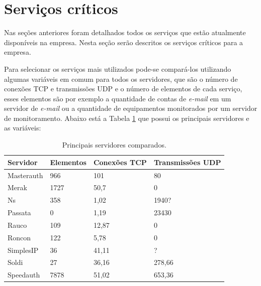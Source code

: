 \section{Serviços críticos}
\label{section:servcrit}

Nas seções anteriores foram detalhados todos os serviços que estão atualmente disponíveis na empresa. Nesta seção serão descritos os serviços 
críticos para a empresa. 

Para selecionar os serviços mais utilizados pode-se compará-los utilizando algumas variáveis em comum para todos os servidores, que são o número 
de conexões \ac{TCP} e transmissões \ac{UDP} e o número de elementos de cada serviço, esses elementos são por exemplo a quantidade de 
contas de \textit{e-mail} em um servidor de \textit{e-mail} ou a quantidade de equipamentos monitorados por um servidor de monitoramento. 
Abaixo está a Tabela \ref{tab:servicoscompara} que possui os principais servidores e as variáveis:

\begin{table}[h!]
\caption{Principais servidores comparados.}
\label{tab:servicoscompara}
\begin{center}
\begin{tabular}{|p{2cm}|l|l|l|}\hline
Servidor & Elementos & Conexões TCP & Transmissões UDP\\\hline
Masterauth & 966 & 101 & 80\\\hline
Merak & 1727 & 50,7 & 0\\\hline
Ns & 358 & 1,02 & 1940?\\\hline
Passata & 0 & 1,19 & 23430\\\hline
Rauco & 109 & 12,87 & 0\\\hline
Roncon & 122 & 5,78 & 0\\\hline
SimplesIP & 36 & 41,11 & ?\\\hline
Soldi & 27 & 36,16 & 278,66\\\hline
Speedauth & 7878 & 51,02 & 653,36\\\hline
\end{tabular}
\end{center}
\end{table}

